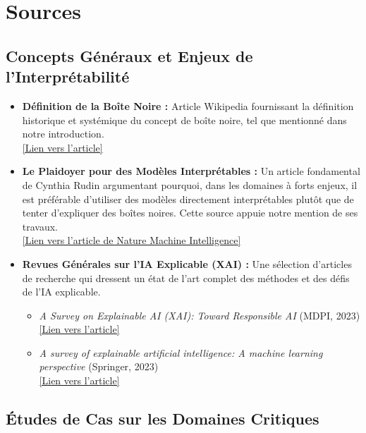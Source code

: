 \documentclass{article}
\begin{document}
\clearpage

\section{Sources}

\subsection*{Concepts Généraux et Enjeux de l'Interprétabilité}

\begin{itemize}
    \item \textbf{Définition de la Boîte Noire :} Article Wikipedia fournissant la définition historique et systémique du concept de boîte noire, tel que mentionné dans notre introduction. \\
    \href{https://fr.wikipedia.org/wiki/Boîte_noire_(système)}{[Lien vers l'article]}

    \item \textbf{Le Plaidoyer pour des Modèles Interprétables :} Un article fondamental de Cynthia Rudin argumentant pourquoi, dans les domaines à forts enjeux, il est préférable d'utiliser des modèles directement interprétables plutôt que de tenter d'expliquer des boîtes noires. Cette source appuie notre mention de ses travaux. \\
    \href{https://www.nature.com/articles/s42256-019-0133-z}{[Lien vers l'article de Nature Machine Intelligence]}

    \item \textbf{Revues Générales sur l'IA Explicable (XAI) :} Une sélection d'articles de recherche qui dressent un état de l'art complet des méthodes et des défis de l'IA explicable.
    \begin{itemize}
        \item \textit{A Survey on Explainable AI (XAI): Toward Responsible AI} (MDPI, 2023) \\
        \href{https://www.mdpi.com/2078-2489/14/8/426}{[Lien vers l'article]}
        \item \textit{A survey of explainable artificial intelligence: A machine learning perspective} (Springer, 2023) \\
        \href{https://link.springer.com/article/10.1007/s12559-023-10179-8}{[Lien vers l'article]}
    \end{itemize}
\end{itemize}

\subsection*{Études de Cas sur les Domaines Critiques}
\end{document}
